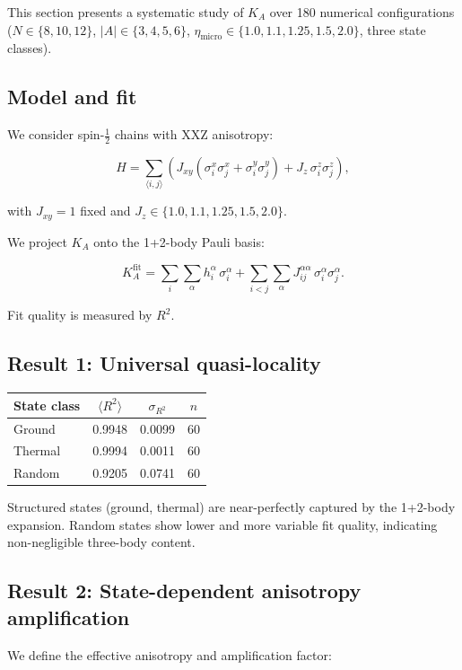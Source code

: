 \documentclass[11pt]{article}
\begin{document}
This section presents a systematic study of $K_A$ over 180 numerical
configurations ($N \in \{8,10,12\}$, $|A| \in \{3,4,5,6\}$,
$\eta_{\mathrm{micro}} \in \{1.0, 1.1, 1.25, 1.5, 2.0\}$,
three state classes).

\subsection{Model and fit}

We consider spin-$\tfrac{1}{2}$ chains with XXZ anisotropy:

\[
H = \sum_{\langle i,j\rangle}
\left( J_{xy}(\sigma_i^x\sigma_j^x + \sigma_i^y\sigma_j^y)
+ J_z\,\sigma_i^z\sigma_j^z \right),
\]

with $J_{xy}=1$ fixed and $J_z \in \{1.0, 1.1, 1.25, 1.5, 2.0\}$.

We project $K_A$ onto the 1+2-body Pauli basis:

\[
K_A^{\mathrm{fit}} =
\sum_i \sum_{\alpha} h_i^\alpha\,\sigma_i^\alpha
+ \sum_{i<j}\sum_{\alpha} J_{ij}^{\alpha\alpha}\,\sigma_i^\alpha\sigma_j^\alpha.
\]

Fit quality is measured by $R^2$.

\subsection{Result 1: Universal quasi-locality}

\begin{center}
\begin{tabular}{lccc}
\toprule
State class & $\langle R^2\rangle$ & $\sigma_{R^2}$ & $n$ \\
\midrule
Ground  & 0.9948 & 0.0099 & 60 \\
Thermal & 0.9994 & 0.0011 & 60 \\
Random  & 0.9205 & 0.0741 & 60 \\
\bottomrule
\end{tabular}
\end{center}

Structured states (ground, thermal) are near-perfectly captured
by the 1+2-body expansion. Random states show lower and more variable
fit quality, indicating non-negligible three-body content.

\subsection{Result 2: State-dependent anisotropy amplification}

We define the effective anisotropy and amplification factor:
\end{document}
